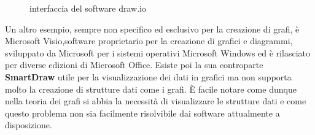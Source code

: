 {\begin{figure}[!htb]
\begin{center}
	\end{center}
	\caption{interfaccia del software draw.io\label{fig:drawIo}}
\end{figure}
Un altro esempio, sempre non specifico ed esclusivo per la creazione di grafi, è Microsoft Visio,software proprietario per la creazione di grafici e diagrammi, sviluppato da Microsoft per i sistemi operativi Microsoft Windows ed è rilasciato per diverse edizioni di Microsoft Office. Esiste poi la sua controparte \textbf{SmartDraw} utile per la visualizzazione dei dati in grafici ma non supporta molto la creazione di strutture dati come i grafi.
È facile notare come dunque nella teoria dei grafi si abbia la necessità di visualizzare le strutture dati e come questo problema non sia facilmente risolvibile dai software attualmente a disposizione.
}